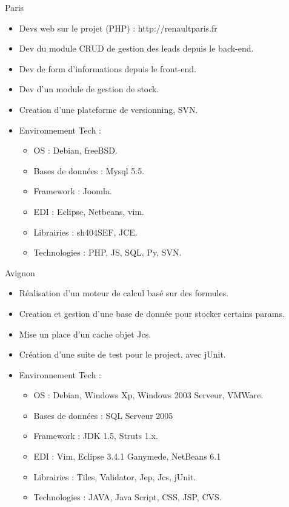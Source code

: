 \documentclass[10pt,a4paper,sans]{moderncv}
\begin{document}
{Paris}{
  \begin{itemize}%
    \item Devs web sur le projet (PHP) : http://renaultparis.fr
    \item Dev du module CRUD de gestion des leads depuis le back-end.
    \item Dev de form d'informations depuis le front-end.
    \item Dev d'un module de gestion de stock.
    \item Creation d'une plateforme de versionning, SVN.
    \item Environnement Tech :
      \begin{itemize}%
        \item OS : Debian, freeBSD.
        \item Bases de données : Mysql 5.5.
        \item Framework : Joomla.
        \item EDI : Eclipse, Netbeans, vim.
        \item Librairies : sh404SEF, JCE.
        \item Technologies : PHP, JS, SQL, Py, SVN.
      \end{itemize}
  \end{itemize}}

{Avignon}{
  \begin{itemize}%
    \item Réalisation d'un moteur de calcul basé sur des formules.
    \item Creation et gestion d'une base de donnée pour stocker certains params.
    \item Mise un place d'un cache objet Jcs.
    \item Création d'une suite de test pour le project, avec jUnit.
    \item Environnement Tech :
      \begin{itemize}%
        \item OS : Debian, Windows Xp, Windows 2003 Serveur, VMWare.
        \item Bases de données : SQL Serveur 2005
        \item Framework : JDK 1.5,  Struts 1.x.
        \item EDI : Vim, Eclipse 3.4.1 Ganymede, NetBeans 6.1
        \item Librairies : Tiles, Validator, Jep, Jcs, jUnit.
        \item Technologies : JAVA, Java Script, CSS, JSP, CVS.
      \end{itemize}
  \end{itemize}}
\end{document}
